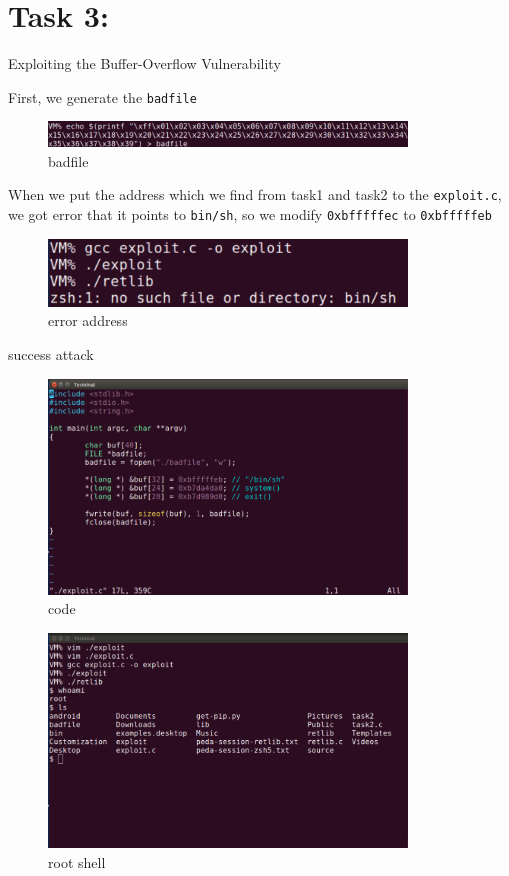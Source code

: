\documentclass[onecolumn,oneside]{SUSTechHomework}
\begin{document}
  \section*{Task 3:}
  Exploiting the Buffer-Overflow Vulnerability

  First, we generate the \verb|badfile|

  \begin{figure}[H]
    \centering
    \includegraphics[width=0.85\textwidth]{img/task3_1.png}
    \caption{badfile}
  \end{figure}

  When we put the address which we find from task1 and task2 to the \verb|exploit.c|, we got error that it points to \verb|bin/sh|, so we modify \verb|0xbfffffec| to \verb|0xbfffffeb|

  \begin{figure}[H]
    \centering
    \includegraphics[width=0.85\textwidth]{img/task3_2.png}
    \caption{error address}
  \end{figure}

  success attack

  \begin{figure}[H]
    \centering
    \includegraphics[width=0.85\textwidth]{img/task3_3.png}
    \caption{code}
  \end{figure}

  \begin{figure}[H]
    \centering
    \includegraphics[width=0.85\textwidth]{img/task3_4.png}
    \caption{root shell}
  \end{figure}
\end{document}
